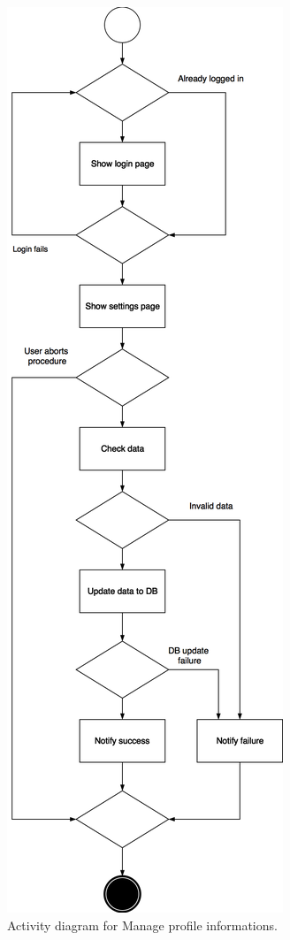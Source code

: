 \documentclass{article}
\begin{document}
	\begin{figure}[h!]
		\bigskip
		\centering
		\includegraphics[scale=0.23]{img/diagrams/manage_profile_informations_ad.png}
		\caption{Activity diagram for Manage profile informations.}
	\end{figure}
\end{document}

